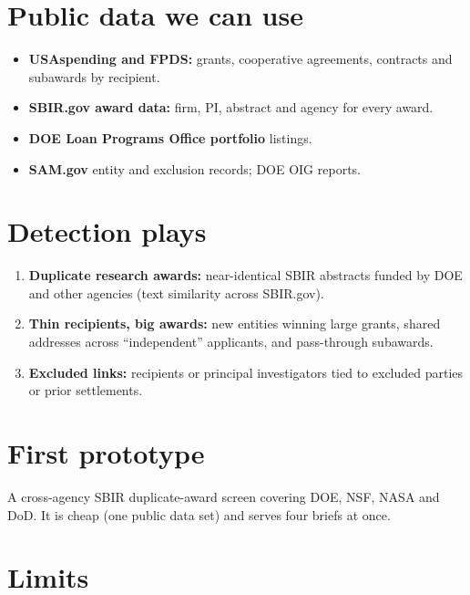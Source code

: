 \documentclass[letterpaper,11pt]{article}
\providecommand{\tightlist}{\setlength{\itemsep}{0pt}\setlength{\parskip}{0pt}}
\begin{document}
\hypertarget{public-data-we-can-use}{%
\section{Public data we can use}\label{public-data-we-can-use}}

\begin{itemize}
\tightlist
\item
  \textbf{USAspending and FPDS:} grants, cooperative agreements,
  contracts and subawards by recipient.
\item
  \textbf{SBIR.gov award data:} firm, PI, abstract and agency for every
  award.
\item
  \textbf{DOE Loan Programs Office portfolio} listings.
\item
  \textbf{SAM.gov} entity and exclusion records; DOE OIG reports.
\end{itemize}

\hypertarget{detection-plays}{%
\section{Detection plays}\label{detection-plays}}

\begin{enumerate}
\def\labelenumi{\arabic{enumi}.}
\tightlist
\item
  \textbf{Duplicate research awards:} near-identical SBIR abstracts
  funded by DOE and other agencies (text similarity across SBIR.gov).
\item
  \textbf{Thin recipients, big awards:} new entities winning large
  grants, shared addresses across ``independent'' applicants, and
  pass-through subawards.
\item
  \textbf{Excluded links:} recipients or principal investigators tied to
  excluded parties or prior settlements.
\end{enumerate}

\hypertarget{first-prototype}{%
\section{First prototype}\label{first-prototype}}

A cross-agency SBIR duplicate-award screen covering DOE, NSF, NASA and
DoD. It is cheap (one public data set) and serves four briefs at once.

\hypertarget{limits}{%
\section{Limits}\label{limits}}
\end{document}
